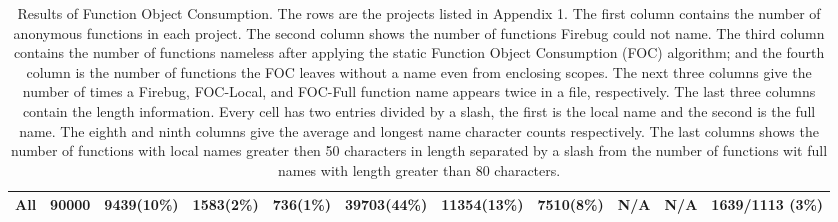 \documentclass[10pt, preprint]{sigplanconf}
\begin{document}
\begin{table}[htp]
{\begin{tabular}{ | l | l | l | l | l | l | l | l | l | l | l |}
  \hline 
   All           & 90000     &   9439(10\%)   & 1583(2\%) & 736(1\%)  &    39703(44\%)      &    11354(13\%) & 7510(8\%)   & N/A       & N/A      & 1639/1113 (3\%)  \\ 
  \hline       
  \end{tabular}
  }
\caption{Results of Function Object Consumption. The rows are the projects listed in Appendix 1. The first column contains the number of anonymous functions in each project. The second column shows the number of functions Firebug could not name. The third column contains the number of functions nameless after applying the static Function Object Consumption (FOC) algorithm; and the fourth column is the number of functions the FOC leaves without a name even from enclosing scopes. The next three columns give the number of times a Firebug, FOC-Local, and FOC-Full function name appears twice in a file, respectively. The last three columns contain the length information. Every cell has two entries divided by a slash, the first is the local name and the second is the full name. The eighth and ninth columns give the average and longest name character counts respectively. The last columns shows the number of functions with local names greater then 50 characters in length separated by a slash from the number of functions wit full names with length greater than 80 characters.} 
 \label{evaluation} 
\end{table}    



\end{document}
